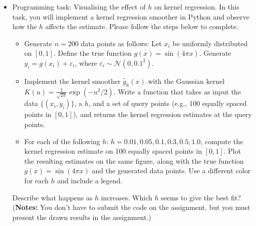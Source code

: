 \documentclass[10pt]{article}
\begin{document}
\begin{enumerate}
\begin{itemize}
	\item[(c)]  Programming task: Visualising the effect of $h$ on kernel regression. In this task, you will implement a kernel regression smoother in Python and observe how the $h$ affects the estimate. Please follow the steps below to complete.
	\begin{itemize}
		\item[1.] Generate $n=200$ data points as follows: Let $x_i$ be uniformly distributed on $[0,1]$. Define the true function $g(x) = \sin(4\pi x)$. Generate $y_i = g(x_i) + \varepsilon_i$, where $\varepsilon_i \sim \mathcal{N}(0, 0.1^{2})$.
		
		\item[2.] Implement the kernel smoother $\hat{g}_{h}(x)$ with the Gaussian kernel $K(u)=\frac{1}{\sqrt{2\pi}}\exp(-u^2/2)$. Write a function that takes as input the data $\{(x_i,y_i)\}$, a $h$, and a set of query points (e.g., 100 equally spaced points in $[0,1]$), and returns the kernel regression estimates at the query points.
		
		\item[3.] For each of the following $h$: $h = 0.01, 0.05, 0.1, 0.3, 0.5, 1.0$, compute the kernel regression estimate on 100 equally spaced points in $[0,1]$. Plot the resulting estimates on the same figure, along with the true function $g(x)=\sin(4\pi x)$ and the generated data points. Use a different color for each $h$ and include a legend. 
	\end{itemize}
	Describe what happens as $h$ increases. Which $h$ seems to give the best fit? (\textbf{Notes:} You don't have to submit the code on the assignment, but you must present the drawn results in the assignment.)



\end{itemize}

\end{enumerate}
\end{document}
